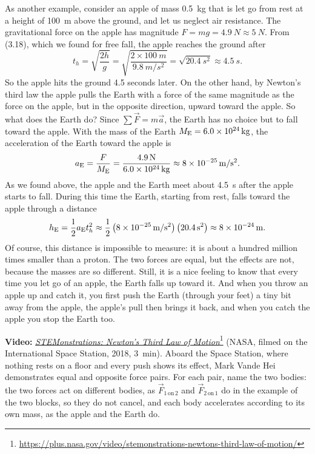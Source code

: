 \documentclass[11pt,a4paper]{article}
\newcommand{\on}[2]{#1\,\mathrm{on}\,#2}   %
\begin{document}
As another example, consider an apple of mass \qty{0.5}{kg} that is let go from rest at a height of
\qty{100}{m} above the ground, and let us neglect air resistance. The gravitational force on the
apple has magnitude $F = mg = \qty{4.9}{N} \approx \qty{5}{N}$. From (3.18), which we found for free
fall, the apple reaches the ground after
\begin{equation}\label{eq:apple-t}
  t_h = \sqrt{\frac{2h}{g}} = \sqrt{\frac{2\times\qty{100}{m}}{\qty{9.8}{m/s^2}}} =
  \sqrt{\qty{20.4}{s^2}} \approx \qty{4.5}{s} .
\end{equation}
So the apple hits the ground 4.5 seconds later. On the other hand, by Newton's third law the apple
pulls the Earth with a force of the same magnitude as the force on the apple, but in the opposite
direction, upward toward the apple. So what does the Earth do? Since $\sum\vec{F} = m\vec{a}$, the
Earth has no choice but to fall toward the apple. With the mass of the Earth $M_{\mathrm{E}} =
\qty{6.0e24}{kg}$, the acceleration of the Earth toward the apple is
\begin{equation}\label{eq:aE}
  a_{\mathrm{E}} = \frac{F}{M_{\mathrm{E}}} = \frac{\qty{4.9}{N}}{\qty{6.0e24}{kg}} \approx \qty{8e-25}{m/s^2} .
\end{equation}
As we found above, the apple and the Earth meet about \qty{4.5}{s} after the apple starts to fall.
During this time the Earth, starting from rest, falls toward the apple through a distance
\begin{equation}\label{eq:hE}
  h_{\mathrm{E}} = \frac{1}{2} a_{\mathrm{E}} t_h^2 \approx \frac{1}{2}\left(\qty{8e-25}{m/s^2}\right)\left(\qty{20.4}{s^2}\right)
  \approx \qty{8e-24}{m} .
\end{equation}
Of course, this distance is impossible to measure: it is about a hundred million times smaller than
a proton. The two forces are equal, but the effects are not, because the masses are so different.
Still, it is a nice feeling to know that every time you let go of an apple, the Earth falls up
toward it. And when you throw an apple up and catch it, you first push the Earth (through your
feet) a tiny bit away from the apple, the apple's pull then brings it back, and when you catch the
apple you stop the Earth too.

\begin{aside}
\textbf{Video:}
\href{https://plus.nasa.gov/video/stemonstrations-newtons-third-law-of-motion/}{\emph{STEMonstrations:
Newton's Third Law of
Motion}}\footnote{\url{https://plus.nasa.gov/video/stemonstrations-newtons-third-law-of-motion/}}
(NASA, filmed on the International Space Station, 2018, 3~min). Aboard the Space Station, where
nothing rests on a floor and every push shows its effect, Mark Vande Hei demonstrates equal and
opposite force pairs. For each pair, name the two bodies: the two forces act on different bodies,
as $\vec{F}_{\on{1}{2}}$ and $\vec{F}_{\on{2}{1}}$ do in the example of the two blocks, so they do
not cancel, and each body accelerates according to its own mass, as the apple and the Earth do.
\end{aside}
\end{document}
